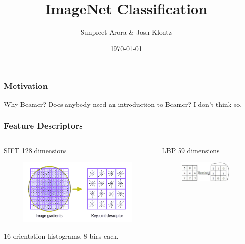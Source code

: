 \documentclass{beamer}
\title[ImageNet]{ImageNet Classification}
\author{Sunpreet Arora \& Josh Klontz}
\date{\today}
\begin{document}
%
\begin{frame}
\titlepage
\end{frame}
%
\begin{frame}
\frametitle{Motivation}
\begin{block}
{Why Beamer?}
Does anybody need an introduction to Beamer? I don't think so.
\end{block}
\end{frame}

\begin{frame}
\frametitle{Feature Descriptors}
\begin{columns}
\begin{column}{.3\textwidth}
\begin{block}{SIFT}
128 dimensions
\begin{figure}
\includegraphics[width=\textwidth]{SIFT}
\end{figure}
16 orientation histograms, 8 bins each.
\end{block}
\end{column}
\pause
\begin{column}{.3\textwidth}
\begin{block}{LBP}
59 dimensions
\begin{figure}
\includegraphics[width=\textwidth]{LBPSimple}
\end{figure}
\begin{figure}

\end{figure}
\end{block}
\end{column}
\end{columns}
\end{frame}
\end{document}
